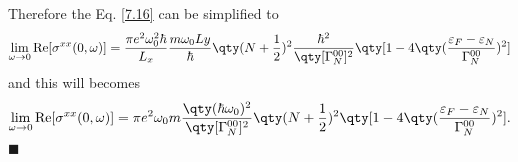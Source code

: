 Therefore the Eq. \eqref{7.16} can be simplified to
\begin{equation} \label{7.18}
  \begin{aligned}
    \lim_{\omega \to 0}
    \text{Re}[{\sigma}^{xx}(0,\omega)] =
    \frac{\pi e^2 \omega_0^2 \hbar}{L_x}
    \frac{m\omega_0 Ly}{\hbar}
    \qty(N + \frac{1}{2})^2
    \frac{\hbar^2}
    {\qty[\Gamma^{00}_{N}]^2}
    \qty[
      1 -
      4\qty(\frac{{\varepsilon_F}-{\varepsilon_N}}{\Gamma^{00}_{N}})^2
    ]
  \end{aligned}
\end{equation}
and this will becomes
\begin{equation} \label{7.19}
  \begin{aligned}
    \lim_{\omega \to 0}
    \text{Re}[{\sigma}^{xx}(0,\omega)] =
    {\pi e^2 \omega_0 m }
    \frac{\qty(\hbar \omega_0)^2}
    {\qty[\Gamma^{00}_{N}]^2}
    \qty(N + \frac{1}{2})^2
    \qty[
      1 -
      4\qty(\frac{{\varepsilon_F}-{\varepsilon_N}}{\Gamma^{00}_{N}})^2
    ].
  \end{aligned}
\end{equation}
\hfill$\blacksquare$
